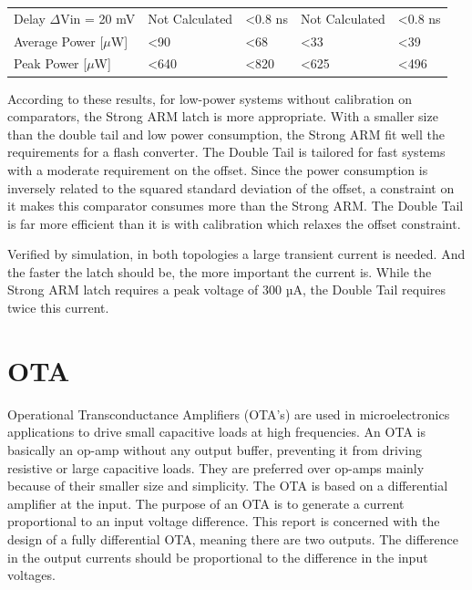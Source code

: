 \begin{table}[ht]
\begin{tabular}{@{}lllll@{}}
    Delay \(\Delta\)Vin = 20 mV                                                                                   & Not Calculated                            & \textless 0.8 ns              & Not Calculated              & \textless 0.8 ns              \\
    Average Power {[}\(\mu\)W{]}                                                                               & \textless 90                 & \textless 68                  & \textless 33                & \textless 39                  \\
    Peak Power {[}\(\mu\)W{]}                                                                                  & \textless 640                & \textless 820                 & \textless 625               & \textless 496                 \\ \bottomrule
    \end{tabular}
    \end{table}

According to these results, for low-power systems without calibration on comparators, the Strong ARM latch is more appropriate. With a smaller size than the double tail and low power consumption, the Strong ARM fit well the requirements for a flash converter.
The Double Tail is tailored for fast systems with a moderate requirement on the offset. Since the power consumption is inversely related to the squared standard deviation of the offset, a constraint on it makes this comparator consumes more than the Strong ARM\@. The Double Tail is far more efficient than it is with calibration which relaxes the offset constraint.

Verified by simulation, in both topologies a large transient current is needed. And the faster the latch should be, the more important the current is. While the Strong ARM latch requires a peak voltage of 300 µA, the Double Tail requires twice this current.

\section{OTA}                              %
Operational Transconductance Amplifiers (OTA's) are used in microelectronics applications to drive small capacitive loads at high frequencies. An OTA is basically an op-amp without any output buffer, preventing it from driving resistive or large capacitive loads. They are preferred over op-amps mainly because of their smaller size and simplicity. The OTA is based on a differential amplifier at the input. The purpose of an OTA is to generate a current proportional to an input voltage difference. This report is concerned with the design of a fully differential OTA, meaning there are two outputs. The difference in the output currents should be proportional to the difference in the input voltages.
